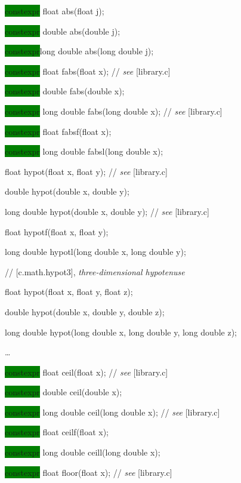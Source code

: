 \documentclass[prd,twocolumn,amsmath,amssymb,nofootinbib,eqsecnum]{revtex4-1}
\newcommand{\highlight}[1]{\colorbox{green}{\!\!\!\! #1}}
\newcommand{\stdcomment}[1]{{// {\it see} [#1]}}
\begin{document}
{\highlight{constexpr} float abs(float j);

\highlight{constexpr} double abs(double j);

\highlight{constexpr}long double abs(long double j);

\vspace{2ex}

\highlight{constexpr} float fabs(float x); \stdcomment{library.c}

\highlight{constexpr} double fabs(double x);

\highlight{constexpr} long double fabs(long double x); \stdcomment{library.c}

\highlight{constexpr} float fabsf(float x);

\highlight{constexpr} long double fabsl(long double x);

\vspace{2ex}

float hypot(float x, float y); \stdcomment{library.c}

double hypot(double x, double y);

long double hypot(double x, double y); \stdcomment{library.c}

float hypotf(float x, float y);

long double hypotl(long double x, long double y);

\vspace{2ex}

// [c.math.hypot3], {\it three-dimensional hypotenuse}

float hypot(float x, float y, float z);

double hypot(double x, double y, double z);

long double hypot(long double x, long double y, long double z);

\vspace{2ex}
\ldots
\vspace{2ex}

\highlight{constexpr} float ceil(float x); \stdcomment{library.c}

\highlight{constexpr} double ceil(double x);

\highlight{constexpr} long double ceil(long double x); \stdcomment{library.c}

\highlight{constexpr} float ceilf(float x);

\highlight{constexpr} long double ceill(long double x);

\vspace{2ex}

\highlight{constexpr} float floor(float x); \stdcomment{library.c}

}
\end{document}
